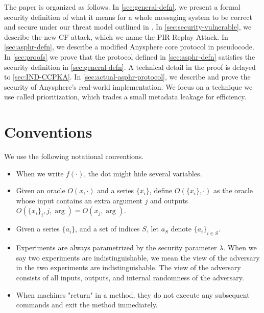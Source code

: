 The paper is organized as follows. In \cref{sec:general-defn}, we present a formal security definition of what it means for a whole messaging system to be correct and secure under our threat model outlined in \cite{whitepaper}. In \cref{sec:security-vulnerable}, we describe the new CF attack, which we name the PIR Replay Attack. In \cref{sec:asphr-defn}, we describe a modified Anysphere core protocol in pseudocode. In \cref{sec:proofs} we prove that the protocol defined in \cref{sec:asphr-defn} satisfies the security definition in \cref{sec:general-defn}. A technical detail in the proof is delayed to \cref{sec:IND-CCPKA}. In \cref{sec:actual-asphr-protocol}, we describe and prove the security of Anysphere's real-world implementation. We focus on a technique we use called prioritization, which trades a small metadata leakage for efficiency.



\section{Conventions}
We use the following notational conventions.
\begin{itemize}
    \item When we write $f(\cdot)$, the dot might hide several variables.
    
    \item Given an oracle $O(x, \cdot)$ and a series $\{x_i\}$, define $O(\{x_i\}, \cdot)$ as the oracle whose input contains an extra argument $j$ and outputs $O(\{x_i\}_i, j, \arg) = O(x_j, \arg)$.

    \item Given a series $\{a_i\}$, and a set of indices $S$, let $a_S$ denote $\{a_i\}_{i \in S}$. 

    \item Experiments are always parametrized by the security parameter $\lambda$. When we say two experiments are indistinguishable, we mean the view of the adversary in the two experiments are indistinguishable. The view of the adversary consists of all inputs, outputs, and internal randomness of the adversary.
    
    \item When machines "return" in a method, they do not execute any subsequent commands and exit the method immediately.
\end{itemize}
